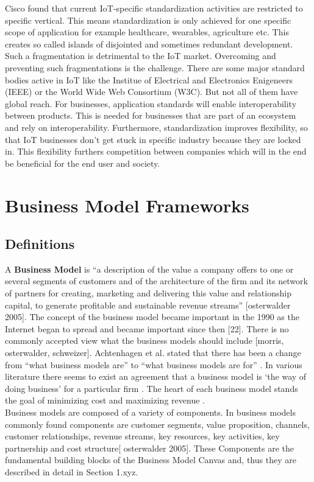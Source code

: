 Cisco found that current IoT-specific standardization activities are restricted to specific vertical. This means standardization is only achieved for one specific scope of application for example healthcare, wearables, agriculture etc. This creates so called islands of disjointed and sometimes redundant development.
Such a fragmentation is detrimental to the IoT market. Overcoming and preventing such fragmentations is the challenge. There are some major standard bodies active in IoT like the Institue of Electrical and Electronics Enigeneers (IEEE) or the World Wide Web Consortium (W3C). But not all of them have global reach.
For businesses, application standards will enable interoperability between products.  This is needed for businesses that are part of an ecosystem and rely on interoperability. Furthermore, standardization improves flexibility, so that IoT businesses don't get stuck in specific industry because they are locked in. This flexibility furthers competition between companies which will in the end be beneficial for the end user and society.




\section{Business Model Frameworks}
	
	\subsection{Definitions}
	 A \textbf{Business Model} is ``a description of the value a company offers to one or several segments of customers and of the architecture of the firm and its network of partners for creating, marketing and delivering this value and relationship capital, to generate profitable and sustainable revenue streams'' [osterwalder 2005]. The concept of the business model became important in the 1990 as the Internet began to spread and became important since then [22]. There is no commonly accepted view what the business models should include [morris, osterwalder, schweizer]. Achtenhagen et al. stated that there has been a change from ``what business models are'' to ``what business models are for'' \cite{westerlund}. In various literature there seems to exist an agreement that a business model is `the way of doing business' for a particular firm \cite{westerlund}. The heart of each business model stands the goal of minimizing cost and maximizing revenue \cite{ju}.\\
	 Business models are composed of a variety of components. In business models commonly found components are customer segments, value proposition, channels, customer relationships, revenue streams, key resources, key activities, key partnership and cost structure[ osterwalder 2005]. These Components are the fundamental building blocks of the Business Model Canvas and, thus they are described in detail in Section 1.xyz. \\

